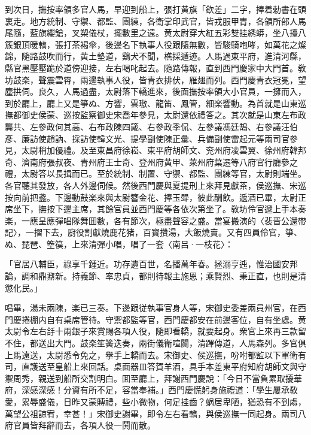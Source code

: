 到次日，撫按率領多官人馬，早迎到船上，張打黄旗「欽差」二字，捧着勅書在頭裏走。地方統制、守禦、都監、團練，各衛掌印武官，皆戎服甲胄，各領所部人馬尾隨，藍旗纓鎗，叉槊儀杖，擺數里之遠。黄太尉穿大紅五彩雙挂綉蟒，坐八擡八簇銀頂暖轎，張打茶褐傘，後邊名下執事人役跟隨無數，皆駿騎咆哮，如萬花之燦錦，隨路鼓吹而行，黄土墊道，鷄犬不聞，樵採遁迹。人馬過東平府，進清河縣，縣官黑壓壓跪於道傍迎接，左右喝叱起去。隨路傳報，直到西門慶家中大門首。敎坊鼓楽，聲震雲霄，兩邊執事人役，皆青衣排伏，雁翅而列。西門慶青衣冠冕，望塵拱伺。良久，人馬過盡，太尉落下轎進來，後面撫按率領大小官員，一擁而入，到於廳上，廳上又是箏ぬ、方響，雲璈、龍笛、鳳管，細楽響動。為首就是山東巡撫都御史侯蒙、巡按監察御史宋喬年參見，太尉還依禮答之。其次就是山東左布政龔共、左參政何其高、右布政陳四箴、右參政季侃、左參議馮廷鵠、右參議汪伯彥、廉訪使趙訥、採訪使韓文光、提學副使陳正彙、兵備副使雷起元等兩司官參見，太尉稍加優禮。及至東昌府徐崧、東平府胡師文、兖州府凌雲翼、徐州府韓邦奇、濟南府張叔夜、青州府王士奇、登州府黄甲、萊州府葉遷等八府官行廳參之禮，太尉答以長揖而已。至於統制、制置、守禦、都監、團練等官，太尉則端坐。各官聽其發放，各人外邊伺候。然後西門慶與夏提刑上來拜見獻茶，侯巡撫、宋巡按向前把盞。下邊動鼓楽來與太尉簪金花、捧玉斝，彼此酬飲。遞酒已畢，太尉正席坐下，撫按下邊主席，其餘官員並西門慶等各依次第坐了。敎坊伶官遞上手本奏楽，一應呈應彈唱隊舞囬數，各有節次，極盡聲容之盛。當宴搬演的〈裴晋公還帶記〉，一摺下去，廚役割獻燒鹿花猪，百寳攢湯，大飯燒賣。又有四員伶官，箏、ぬ、琵琶、箜篌，上來清彈小唱，唱了一套〈南吕·一枝花〉：

\begin{myquote}
「官居八輔臣，祿享千鍾近。功存遺百世，名播萬年春。拯溺亨迍，惟治國安邦論，調和鼎鼐新。持義節、率忠貞，都則待報主施恩；乘賢烈、秉正直，也則是清懲化民。」
\end{myquote}

唱畢，湯未兩陳，楽已三奏。下邊跟従執事官身人等，宋御史委差兩員州官，在西門慶捲棚内自有桌席管待。守禦都監等官，西門慶都安在前邊客位，自有坐處。黄太尉令左右㧱十兩銀子來賞賜各項人役，隨即看轎，就要起身。衆官上來再三款留不住，都送出大門。鼓楽笙簧迭奏，兩街儀衛喧闐，清蹕傳道，人馬森列。多官俱上馬遠送，太尉悉令免之，擧手上轎而去。宋御史、侯巡撫，吩咐都監以下軍衛有司，直護送至皇船上來回話。桌面器皿答賀羊酒，具手本差東平府知府胡師文與守禦周秀，親送到船所交割明白。囬至廳上，拜謝西門慶說：「今日不當負累取擾華府，深感深感！分資有所不足，容當奉補。」西門慶慌躬身施禮道：「學生屢承敎愛，累辱盛儀，日昨又蒙賻禮，些小微物，何足挂齒？蜗居卑陋，猶恐有不到䖏，萬望公祖諒宥，幸甚！」宋御史謝畢，即令左右看轎，與侯巡撫一同起身。兩司八府官員皆拜辭而去，各項人役一鬨而散。

